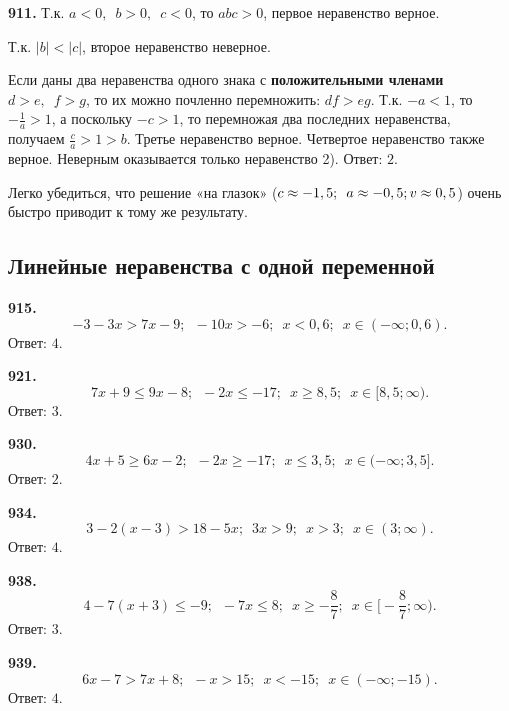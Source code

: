\textbf{911.} Т.к. $a<0,\enspace b>0,\enspace c<0$, то $abc>0$, первое неравенство верное. 

Т.к. $|b|<|c|$, второе неравенство неверное. 

Если даны два неравенства одного знака с \textbf{положительными членами} $d>e,\enspace f>g$, то их можно почленно перемножить: $df>eg$. Т.к. $-a<1$, то $-\frac{1}{a}>1$, а поскольку $-c>1$, то перемножая два последних неравенства, получаем  $\frac{c}{a}>1>b$. Третье неравенство верное. Четвертое неравенство также верное. Неверным оказывается только неравенство 2). \newline \null \hspace*{\fill} Ответ: $2$.

Легко убедиться, что решение «на глазок» ($c\approx-1,5;\enspace a\approx-0,5;\linebreak v\approx0,5$) очень быстро приводит к тому же результату.


\subsection{Линейные неравенства с одной переменной}

\textbf{915.} $$-3-3x>7x-9;\enspace -10x>-6;\enspace x<0,6;\enspace x\in(-\infty;0,6).$$ \newline \null \hspace*{\fill} Ответ: $4$. 

\textbf{921.} $$7x+9\leq9x-8;\enspace -2x\leq-17;\enspace x\geq8,5;\enspace x\in[8,5;\infty).$$ \newline \null \hspace*{\fill} Ответ: $3$. 

\textbf{930.} $$4x+5\geq6x-2;\enspace-2x\geq-17;\enspace x\leq3,5;\enspace x\in(-\infty;3,5].$$ \newline \null \hspace*{\fill} Ответ: $2$. 

\textbf{934.} $$3-2(x-3)>18-5x;\enspace 3x>9;\enspace x>3;\enspace x\in(3;\infty).$$ \newline \null \hspace*{\fill} Ответ: $4$.

\textbf{938.} $$4-7(x+3)\leq-9;\enspace -7x\leq8;\enspace x\geq-\frac{8}{7};\enspace x\in\bigg[-\frac{8}{7};\infty\bigg).$$ \newline \null \hspace*{\fill} Ответ: $3$. 

\textbf{939.} $$6x-7>7x+8;\enspace -x>15;\enspace x<-15;\enspace x\in(-\infty;-15).$$ \newline \null \hspace*{\fill} Ответ: $4$.

